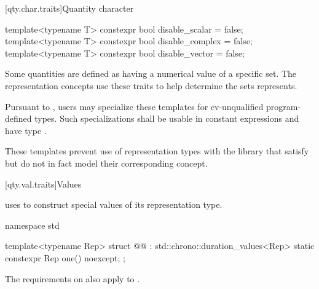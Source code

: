 [qty.char.traits]{Quantity character}

\begin{itemdecl}
template<typename T>
constexpr bool disable_scalar = false;
template<typename T>
constexpr bool disable_complex = false;
template<typename T>
constexpr bool disable_vector = false;
\end{itemdecl}

\begin{itemdescr}
\pnum
Some quantities are defined as having a numerical value of a specific set.
The representation concepts use these traits
to help determine the sets  represents.

\pnum
\remarks
Pursuant to ,
users may specialize these templates
for cv-unqualified program-defined types.
Such specializations shall be usable in constant expressions
and have type .

\pnum
\begin{note}
These templates prevent use of representation types with the library
that satisfy but do not in fact model their corresponding concept.
\end{note}
\end{itemdescr}

[qty.val.traits]{Values}

\pnum
{} uses 
to construct special values of its representation type.

\begin{codeblock}
namespace std {

template<typename Rep>
struct @@ : std::chrono::duration_values<Rep> {
  static constexpr Rep one() noexcept;
};

}
\end{codeblock}

\pnum
The requirements on 
also apply to .


